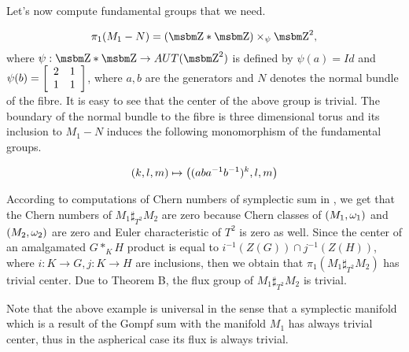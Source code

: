 Let's now compute fundamental groups that we need.  

$$\pi _1(M_1-N)=(\B Z*\B Z)\times _{\psi }\B Z^2,$$
where $\psi :\B Z*\B Z\to AUT(\B Z^2)$ is defined by
$\psi (a)=Id$ and $\psi (b)=\left [ \begin{array}{cc} 2 & 1 \\ 1 & 1 \\ \end{array}\right ] $,
where $a,b$ are the generators and $N$ denotes the normal
bundle of the fibre.
It is easy to see that the center of the above group
is trivial. The boundary of the normal bundle to the fibre
is three dimensional torus and its inclusion to $M_1-N$ induces
the following monomorphism of the fundamental groups.

$$(k,l,m)\mapsto \left  ((aba^{-1}b^{-1})^k,l,m\right)$$

According to computations of Chern numbers of symplectic sum
in \cite{mw}, we get that the Chern numbers of $M_1\sharp _{T^2}M_2$
are zero because Chern classes of $(M_1,\omega _1)$ and $(M_2,\omega _2)$
are zero  and Euler characteristic of $T^2$ is zero as well.
Since the center of an amalgamated $G*_KH$ product is equal to
$i^{-1}(Z(G))\cap j^{-1}(Z(H))$, where $i:K\to G,j:K\to H$
are inclusions, then we obtain that $\pi _1(M_1\sharp _{T^2}M_2)$
has trivial center. Due to Theorem B, the flux group of
$M_1\sharp _{T^2}M_2$ is trivial.

Note that the above example is universal in the sense that
a symplectic manifold which is a result of the Gompf sum with 
the manifold $M_1$  
has always trivial center, thus in the aspherical case
its flux is always trivial. 

\bigskip
\bigskip







